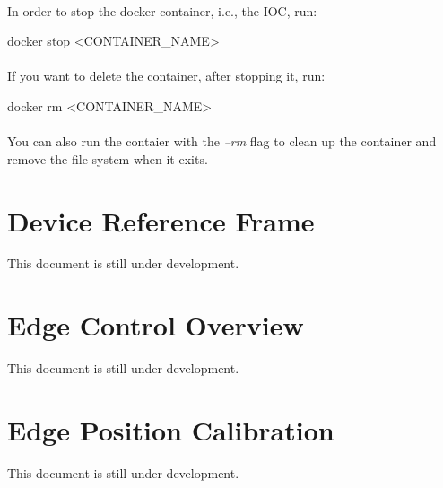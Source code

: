 \documentclass[openany]{article}
\begin{document}
        \paragraph{} In order to stop the docker container, i.e., the IOC, run:

        \vspace{1mm}
        \begin{code}
docker stop <CONTAINER_NAME>
        \end{code}
        \vspace{1mm}

        \paragraph{} If you want to delete the container, after stopping it, run:

        \vspace{1mm}
        \begin{code}
docker rm <CONTAINER_NAME>
        \end{code}
        \vspace{1mm}

        \paragraph{} You can also run the contaier with the \emph{--rm} flag to clean up the container and remove the file system when it exits.

\section{Device Reference Frame}\label{sec:dev-reference-frame}

    This document is still under development.

\section{Edge Control Overview}

    This document is still under development.

\section{Edge Position Calibration}

    This document is still under development.
\end{document}
